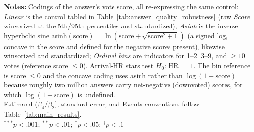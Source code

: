 \begin{table}[H]
\begin{minipage}{\linewidth}
\footnotesize
\raggedright
\textbf{Notes:} Codings of the answer's vote score, all re-expressing the same control: \emph{Linear} is the control tabled in Table~\ref{tab:answer_quality_robustness} (raw \emph{Score} winsorized at the 5th/95th percentiles and standardized); \emph{Asinh} is the inverse hyperbolic sine $\mathrm{asinh}(\mathrm{score})=\ln(\mathrm{score}+\sqrt{\mathrm{score}^2+1})$ (a signed log, concave in the score and defined for the negative scores present), likewise winsorized and standardized; \emph{Ordinal bins} are indicators for 1--2, 3--9, and $\ge 10$ votes (reference score $\le 0$). Arrival-HR stars test $H_0$: HR $=1$. The bin reference is score $\le 0$ and the concave coding uses asinh rather than $\log(1+\mathrm{score})$ because roughly two million answers carry net-negative (downvoted) scores, for which $\log(1+\mathrm{score})$ is undefined.\\
Estimand ($\beta_4$/$\beta_2$), standard-error, and Events conventions follow Table~\ref{tab:main_results}.\\
$^{***}p<.001$; $^{**}p<.01$; $^{*}p<.05$; $^{\dagger}p<.1$
\end{minipage}
\end{table}